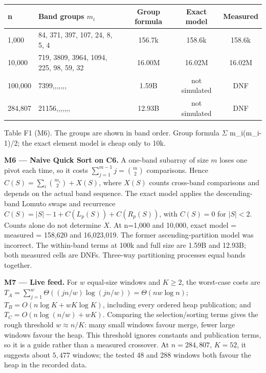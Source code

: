 \documentclass[10pt,a4paper]{article}
\newcommand{\figcaption}[1]{%
  \par\vspace{2pt}%
  {\fontsize{6.8}{8.1}\selectfont\color{muted}#1}%
  \par\vspace{2pt}%
}
\begin{document}
{\fontsize{6.5}{7.8}\selectfont
\renewcommand{\arraystretch}{1.14}
\begin{tabularx}{\linewidth}{@{}L{0.55}L{2.35}C{0.7}C{0.7}C{0.7}@{}}
\toprule{}
\textbf{n} & \textbf{Band groups \(m_i\)} & \textbf{Group formula} & \textbf{Exact model} & \textbf{Measured} \\
,000 & 84, 371, 397, 107, 24, 8, 5, 4 & 156.7k & 158.6k & 158.6k \\
10,000 & 719, 3809, 3964, 1094, 225, 98, 59, 32 & 16.00M & 16.02M & 16.02M \\
100,000 & 7399,,,,,,, & 1.59B & not simulated & DNF \\
284,807 & 21156,,,,,,, & 12.93B & not simulated & DNF \\
\bottomrule
\end{tabularx}}\par\vspace{0.5pt}

\figcaption{Table F1 (M6). The groups are shown in band order. Group formula
\(\Sigma\) m\_i(m\_i-1)/2; the exact element model is cheap only to 10k.}

\textbf{M6 --- Naive Quick Sort on C6.}
                    A one-band subarray of size \(m\) loses one pivot each time,
                    so it costs \(\sum_{j=1}^{m-1}j=\binom m2\) comparisons.
                    Hence \(C(S)=\sum_i\binom{m_i}{2}+X(S)\), where \(X(S)\)
                    counts cross-band comparisons and depends on the actual band sequence.
                    The exact model applies the descending-band Lomuto swaps and recurrence
                    \(C(S)=|S|-1+C(L_p(S))+C(R_p(S))\), with \(C(S)=0\) for \(|S|<2\).
                    Counts alone do not determine \(X\). At n=1,000 and 10,000, exact model = measured = 158,620 and 16,023,019. The former ascending-partition model was incorrect. The within-band terms at 100k and full size are 1.59B and 12.93B; both measured cells are DNFs. Three-way partitioning processes equal bands together.\par

\textbf{M7 --- Live feed.} For \(w\) equal-size windows and \(K\geq2\),
    the worst-case costs are
    \(T_A=\sum_{j=1}^{w}\Theta((jn/w)\log(jn/w))=\Theta(nw\log n)\);
    \(T_B=O(n\log K+wK\log K)\), including every ordered heap publication;
    and \(T_C=O(n\log(n/w)+wK)\). Comparing the selection/sorting terms gives
    the rough threshold \(w\approx n/K\): many small windows favour merge,
    fewer large windows favour the heap. This threshold ignores constants and
    publication terms, so it is a guide rather than a measured crossover.
    At \(n=284{,}807\), \(K=52\), it suggests about \(5{,}477\) windows;
    the tested 48 and 288 windows both favour the heap in the recorded data.\par
\end{document}
